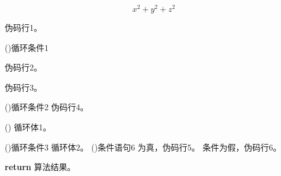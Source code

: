 
	\begin{equation}
		x^2 + y^2 + z^2
	\end{equation}
	


	\begin{algo}[!h]
		\caption{algo环境伪码示例}

		伪码行1。
		
		\For(){循环条件1}{
			伪码行2。
			
			伪码行3。
			
			\DoWhile(){循环条件2}{
				伪码行4。
			}
			
			\Loop(){
				循环体1。
			}
			
			\Repeat(){循环条件3}{
				循环体2。
			}
			\eIf(){条件语句6}{
				为真，伪码行5。
			}{
				条件为假，伪码行6。
			}
		}
		\textbf{return} 算法结果。
	\end{algo}
	


	
